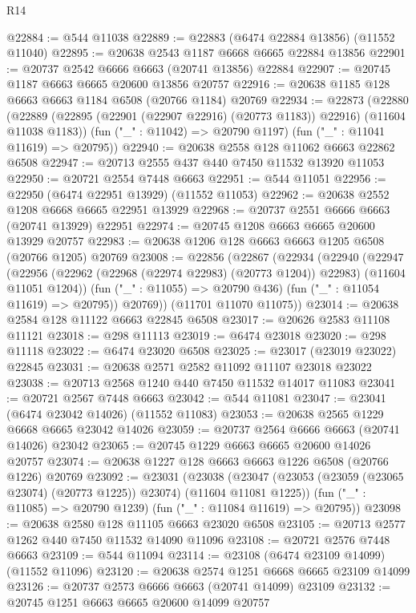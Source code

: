 \begin{lexlean}{R14}
\begin{coremodule}
@22884 := @544 @11038
@22889 := @22883 (@6474 @22884 @13856) (@11552 @11040)
@22895 := @20638 @2543 @1187 @6668 @6665 @22884 @13856
@22901 := @20737 @2542 @6666 @6663 (@20741 @13856) @22884
@22907 := @20745 @1187 @6663 @6665 @20600 @13856 @20757
@22916 := @20638 @1185 @128 @6663 @6663 @1184 @6508 (@20766 @1184) @20769
@22934 := @22873
    (@22880
      (@22889 (@22895 (@22901 (@22907 @22916) (@20773 @1183)) @22916) (@11604 @11038 @1183))
      (fun ("_" : @11042) => @20790 @1197)
      (fun ("_" : @11041 @11619) => @20795))
@22940 := @20638 @2558 @128 @11062 @6663 @22862 @6508
@22947 := @20713 @2555 @437 @440 @7450 @11532 @13920 @11053
@22950 := @20721 @2554 @7448 @6663
@22951 := @544 @11051
@22956 := @22950 (@6474 @22951 @13929) (@11552 @11053)
@22962 := @20638 @2552 @1208 @6668 @6665 @22951 @13929
@22968 := @20737 @2551 @6666 @6663 (@20741 @13929) @22951
@22974 := @20745 @1208 @6663 @6665 @20600 @13929 @20757
@22983 := @20638 @1206 @128 @6663 @6663 @1205 @6508 (@20766 @1205) @20769
@23008 := @22856
    (@22867
      (@22934
        (@22940
          (@22947
            (@22956 (@22962 (@22968 (@22974 @22983) (@20773 @1204)) @22983) (@11604 @11051 @1204))
            (fun ("_" : @11055) => @20790 @436)
            (fun ("_" : @11054 @11619) => @20795))
          @20769))
      (@11701 @11070 @11075))
@23014 := @20638 @2584 @128 @11122 @6663 @22845 @6508
@23017 := @20626 @2583 @11108 @11121
@23018 := @298 @11113
@23019 := @6474 @23018
@23020 := @298 @11118
@23022 := @6474 @23020 @6508
@23025 := @23017 (@23019 @23022) @22845
@23031 := @20638 @2571 @2582 @11092 @11107 @23018 @23022
@23038 := @20713 @2568 @1240 @440 @7450 @11532 @14017 @11083
@23041 := @20721 @2567 @7448 @6663
@23042 := @544 @11081
@23047 := @23041 (@6474 @23042 @14026) (@11552 @11083)
@23053 := @20638 @2565 @1229 @6668 @6665 @23042 @14026
@23059 := @20737 @2564 @6666 @6663 (@20741 @14026) @23042
@23065 := @20745 @1229 @6663 @6665 @20600 @14026 @20757
@23074 := @20638 @1227 @128 @6663 @6663 @1226 @6508 (@20766 @1226) @20769
@23092 := @23031
    (@23038
      (@23047 (@23053 (@23059 (@23065 @23074) (@20773 @1225)) @23074) (@11604 @11081 @1225))
      (fun ("_" : @11085) => @20790 @1239)
      (fun ("_" : @11084 @11619) => @20795))
@23098 := @20638 @2580 @128 @11105 @6663 @23020 @6508
@23105 := @20713 @2577 @1262 @440 @7450 @11532 @14090 @11096
@23108 := @20721 @2576 @7448 @6663
@23109 := @544 @11094
@23114 := @23108 (@6474 @23109 @14099) (@11552 @11096)
@23120 := @20638 @2574 @1251 @6668 @6665 @23109 @14099
@23126 := @20737 @2573 @6666 @6663 (@20741 @14099) @23109
@23132 := @20745 @1251 @6663 @6665 @20600 @14099 @20757

\end{coremodule}
\end{lexlean}
